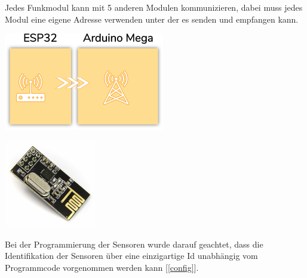 \documentclass[
  12pt, %
  a4paper, %
  oneside, %
  openany, 
  numbers=noenddot, %
  BCOR=5mm, %
  parskip=half*, %
  thesis, %
]{bfhbook}
\newcommand{\compImgSize}{4cm}
\begin{document}
 Jedes Funkmodul kann mit 5 anderen Modulen kommunizieren, dabei muss jedes Modul eine eigene Adresse verwenden unter der es senden und empfangen kann.
\begin{center}
    \begin{minipage}[b]{0.45\textwidth}
        \centering
        \includegraphics[width=7cm]{Bilder/ESP32-Arduino.png} %
        \captionsetup{justification=centering}
    \end{minipage}\hfill
    \begin{minipage}[b]{0.45\textwidth}\label{nrf24}
        \centering
        \includegraphics[width=\compImgSize]{Bilder/NRF24.jpg} %
        \captionsetup{justification=centering}
    \end{minipage}
\end{center}
Bei der Programmierung der Sensoren wurde darauf geachtet, dass die Identifikation der Sensoren über eine einzigartige Id unabhängig vom Programmcode vorgenommen werden kann [\ref{config}].
\end{document}
